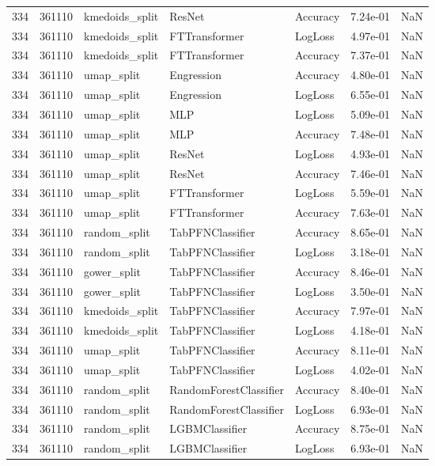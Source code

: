 \begin{tabular}{rrlllrr}
334 & 361110 & kmedoids\_split & ResNet & Accuracy & 7.24e-01 & NaN \\
334 & 361110 & kmedoids\_split & FTTransformer & LogLoss & 4.97e-01 & NaN \\
334 & 361110 & kmedoids\_split & FTTransformer & Accuracy & 7.37e-01 & NaN \\
334 & 361110 & umap\_split & Engression & Accuracy & 4.80e-01 & NaN \\
334 & 361110 & umap\_split & Engression & LogLoss & 6.55e-01 & NaN \\
334 & 361110 & umap\_split & MLP & LogLoss & 5.09e-01 & NaN \\
334 & 361110 & umap\_split & MLP & Accuracy & 7.48e-01 & NaN \\
334 & 361110 & umap\_split & ResNet & LogLoss & 4.93e-01 & NaN \\
334 & 361110 & umap\_split & ResNet & Accuracy & 7.46e-01 & NaN \\
334 & 361110 & umap\_split & FTTransformer & LogLoss & 5.59e-01 & NaN \\
334 & 361110 & umap\_split & FTTransformer & Accuracy & 7.63e-01 & NaN \\
334 & 361110 & random\_split & TabPFNClassifier & Accuracy & 8.65e-01 & NaN \\
334 & 361110 & random\_split & TabPFNClassifier & LogLoss & 3.18e-01 & NaN \\
334 & 361110 & gower\_split & TabPFNClassifier & Accuracy & 8.46e-01 & NaN \\
334 & 361110 & gower\_split & TabPFNClassifier & LogLoss & 3.50e-01 & NaN \\
334 & 361110 & kmedoids\_split & TabPFNClassifier & Accuracy & 7.97e-01 & NaN \\
334 & 361110 & kmedoids\_split & TabPFNClassifier & LogLoss & 4.18e-01 & NaN \\
334 & 361110 & umap\_split & TabPFNClassifier & Accuracy & 8.11e-01 & NaN \\
334 & 361110 & umap\_split & TabPFNClassifier & LogLoss & 4.02e-01 & NaN \\
334 & 361110 & random\_split & RandomForestClassifier & Accuracy & 8.40e-01 & NaN \\
334 & 361110 & random\_split & RandomForestClassifier & LogLoss & 6.93e-01 & NaN \\
334 & 361110 & random\_split & LGBMClassifier & Accuracy & 8.75e-01 & NaN \\
334 & 361110 & random\_split & LGBMClassifier & LogLoss & 6.93e-01 & NaN \\

\end{tabular}
